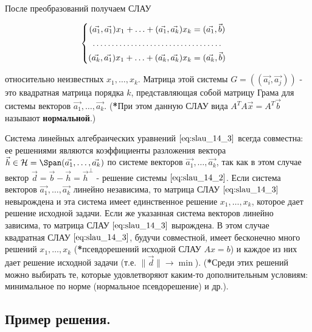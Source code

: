 \bigbreak

После преобразований получаем СЛАУ

\begin{equation}
    \begin{cases}
        \begin{aligned}
            (\vec{a_1}, \vec{a_1}) x_1 + \ldots + (\vec{a_1}, \vec{a_k})x_k &= (\vec{a_1}, \vec{b}) \\
            \hdotsfor{2} \\
            (\vec{a_k}, \vec{a_1}) x_1 + \ldots + (\vec{a_k}, \vec{a_k})x_k &= (\vec{a_k}, \vec{b}) \\
        \end{aligned}
    \end{cases}
    \label{eq:slau_14_3}
\end{equation}

относительно неизвестных $x_1, \ldots, x_k$. Матрица этой системы $G = ((\vec{a_i}, \vec{a_j}))$ - это квадратная матрица порядка $k$, представляющая собой матрицу Грама для системы векторов $\vec{a_1}, \ldots, \vec{a_k}$. (\textbf{*}При этом данную СЛАУ вида $A^TA\vec{x} = A^T\vec{b}$ называют \textbf{нормальной}.)

Система линейных алгебраических уравнений $\eqref{eq:slau_14_3}$ всегда совместна: ее решениями являются коэффициенты разложения вектора $\vec{h} \in \mathcal{H} = \Span(\vec{a_1}, \ldots, \vec{a_k})$ по системе векторов $\vec{a_1}, \ldots, \vec{a_k}$, так как в этом случае вектор $\vec{d} = \vec{b} - \vec{h} = \vec{h}^\perp$ - решение системы $\eqref{eq:slau_14_2}$. Если система векторов $\vec{a_1}, \ldots, \vec{a_k}$ линейно независима, то матрица СЛАУ $\eqref{eq:slau_14_3}$ невырождена и эта система имеет единственное решение $x_1, \ldots, x_k$, которое дает решение исходной задачи. Если же указанная система векторов линейно зависима, то матрица СЛАУ $\eqref{eq:slau_14_3}$ вырождена. В этом случае квадратная СЛАУ $\eqref{eq:slau_14_3}$, будучи совместной, имеет бесконечно много решений $x_1, \ldots, x_k$ (\textbf{*}псевдорешений исходной СЛАУ $Ax = b$) и каждое из них дает решение исходной задачи (т.е. $\lVert \vec{d} \rVert \to \min$). (\textbf{*}Среди этих решений можно выбирать те, которые удовлетворяют каким-то дополнительным условиям: минимальное по норме (нормальное псевдорешение) и др.).

\subsection{
    Пример решения.
}

